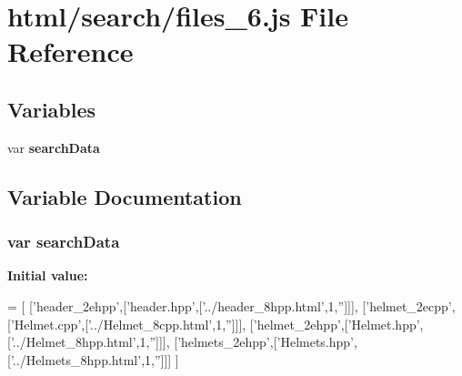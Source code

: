 \section{html/search/files\-\_\-6.js File Reference}
\label{files__6_8js}
\subsection*{Variables}
\begin{DoxyCompactItemize}
\item 
var {\bf search\-Data}
\end{DoxyCompactItemize}


\subsection{Variable Documentation}
\subsubsection[{search\-Data}]{\setlength{\rightskip}{0pt plus 5cm}var search\-Data}\label{files__6_8js_ad01a7523f103d6242ef9b0451861231e}
{\bfseries Initial value\-:}
\begin{DoxyCode}
=
[
  [\textcolor{stringliteral}{'header\_2ehpp'},[\textcolor{stringliteral}{'header.hpp'},[\textcolor{stringliteral}{'../header\_8hpp.html'},1,\textcolor{stringliteral}{''}]]],
  [\textcolor{stringliteral}{'helmet\_2ecpp'},[\textcolor{stringliteral}{'Helmet.cpp'},[\textcolor{stringliteral}{'../Helmet\_8cpp.html'},1,\textcolor{stringliteral}{''}]]],
  [\textcolor{stringliteral}{'helmet\_2ehpp'},[\textcolor{stringliteral}{'Helmet.hpp'},[\textcolor{stringliteral}{'../Helmet\_8hpp.html'},1,\textcolor{stringliteral}{''}]]],
  [\textcolor{stringliteral}{'helmets\_2ehpp'},[\textcolor{stringliteral}{'Helmets.hpp'},[\textcolor{stringliteral}{'../Helmets\_8hpp.html'},1,\textcolor{stringliteral}{''}]]]
]
\end{DoxyCode}
